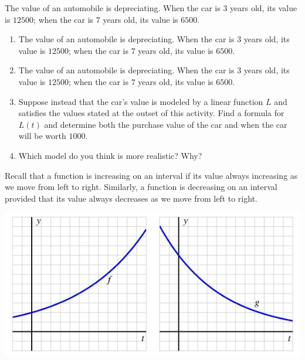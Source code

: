 \documentclass[nooutcomes]{ximera}
\begin{document}
\begin{exploration}
The value of an automobile is depreciating.  When the car is \(3\) years old, its value is \textdollar{}\(12500\); when the car is \(7\) years old, its value is \textdollar{}\(6500\).

\begin{enumerate}[label=\alph*.]
\item The value of an automobile is depreciating.  When the car is \(3\) years old, its value is \textdollar{}\(12500\); when the car is \(7\) years old, its value is \textdollar{}\(6500\).
\item The value of an automobile is depreciating.  When the car is \(3\) years old, its value is \textdollar{}\(12500\); when the car is \(7\) years old, its value is \textdollar{}\(6500\).
\item Suppose instead that the car's value is modeled by a linear function \(L\) and satisfies the values stated at the outset of this activity.  Find a formula for \(L(t)\) and determine both the purchase value of the car and when the car will be worth \textdollar{}\(1000\).
\item Which model do you think is more realistic?  Why?
\end{enumerate}
\end{exploration}


Recall that a function is increasing on an interval if its value always increasing as we move from left to right.  Similarly, a function is decreasing on an interval provided that its value always decreases as we move from left to right.

\begin{image}
\includegraphics{ExpText4.jpg}
\end{image}
\end{document}
